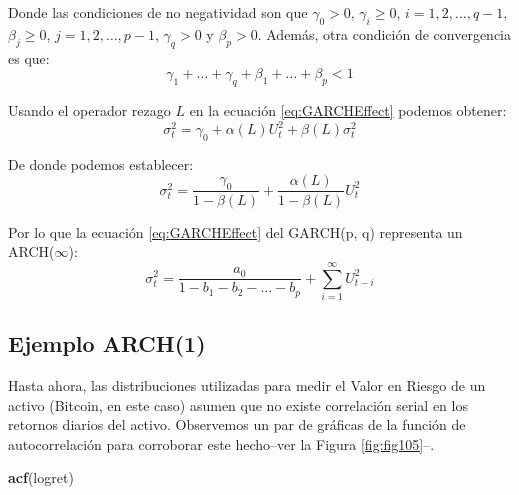 \documentclass[
]{book}
\newenvironment{Shaded}{\begin{snugshade}}{\end{snugshade}}
\newcommand{\FunctionTok}[1]{\textcolor[rgb]{0.13,0.29,0.53}{\textbf{#1}}}
\newcommand{\NormalTok}[1]{#1}
\begin{document}
Donde las condiciones de no negatividad son que \(\gamma_0 > 0\), \(\gamma_i \geq 0\), \(i = 1, 2, \ldots, q-1\), \(\beta_j \geq 0\), \(j = 1, 2, \ldots, p-1\), \(\gamma_q > 0\) y \(\beta_p > 0\). Además, otra condición de convergencia es que:
\begin{equation*}
    \gamma_1 + \ldots + \gamma_q + \beta_1 + \ldots + \beta_p < 1
\end{equation*}

Usando el operador rezago \(L\) en la ecuación \eqref{eq:GARCHEffect} podemos obtener:
\begin{equation}
    \sigma^2_t = \gamma_0 + \alpha(L) U_t^2 + \beta(L) \sigma^2_t
    \label{eq:GARCHEffectL}
\end{equation}

De donde podemos establecer:
\begin{equation}
    \sigma^2_t = \frac{\gamma_0}{1 - \beta(L)} + \frac{\alpha(L)}{1 - \beta(L)} U_t^2 
\end{equation}

Por lo que la ecuación \eqref{eq:GARCHEffect} del GARCH(p, q) representa un ARCH(\(\infty\)):
\begin{equation}
    \sigma^2_t = \frac{a_0}{1 - b_1 - b_2 - \ldots - b_p} + \sum_{i = 1}^\infty U_{t-i}^2 
\end{equation}

\hypertarget{ejemplo-arch1}{%
\subsection{Ejemplo ARCH(1)}\label{ejemplo-arch1}}

Hasta ahora, las distribuciones utilizadas para medir el Valor en Riesgo de un activo (Bitcoin, en este caso) asumen que no existe correlación serial en los retornos diarios del activo. Observemos un par de gráficas de la función de autocorrelación para corroborar este hecho--ver la Figura \ref{fig:fig105}--.

\begin{Shaded}
\begin{Highlighting}[]
\FunctionTok{acf}\NormalTok{(logret)}
\end{Highlighting}
\end{Shaded}
\end{document}
